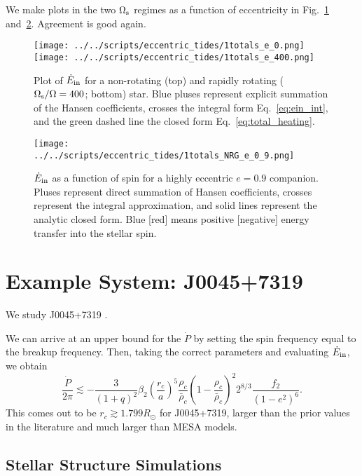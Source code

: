 \documentclass[
        fleqn,
        usenatbib,
    ]{mnras}
\begin{document}
We make plots in the two $\Omega_{\rm s}$ regimes as a function of eccentricity in
Fig.~\ref{fig:e0} and~\ref{fig:e_spin}. Agreement is good again.
\begin{figure}
    \centering
    \texttt{[image: ../../scripts/eccentric\_tides/1totals\_e\_0.png]}
    \texttt{[image: ../../scripts/eccentric\_tides/1totals\_e\_400.png]}
    \caption{Plot of $\dot{E}_{\rm in}$ for a non-rotating (top) and rapidly
    rotating ($\Omega_{\rm s} / \Omega = 400$; bottom) star. Blue pluses
    represent explicit summation of the Hansen coefficients, crosses the
    integral form Eq.~\eqref{eq:ein_int}, and the green dashed line the closed
    form Eq.~\eqref{eq:total_heating}.}\label{fig:e0}
\end{figure}
\begin{figure}
    \centering
    \texttt{[image: ../../scripts/eccentric\_tides/1totals\_NRG\_e\_0\_9.png]}
    \caption{$\dot{E}_{\rm in}$ as a function of spin for a highly eccentric $e
    = 0.9$ companion. Pluses represent direct summation of Hansen coefficients,
    crosses represent the integral approximation, and solid lines represent
    the analytic closed form. Blue [red] means positive [negative]
    energy transfer into the stellar spin.}\label{fig:e_spin}
\end{figure}

\section{Example System: J0045+7319}\label{s:j00457319}

We study J0045+7319 \citep{bell1995psr}.

We can arrive at an upper bound for the $\dot{P}$ by setting the spin frequency
equal to the breakup frequency. Then, taking the correct parameters and
evaluating $\dot{E}_{\rm in}$, we obtain
\begin{equation}
    \frac{\dot{P}}{2\pi} \lesssim
        -\frac{3}{(1 + q)^2}\beta_2 \left(\frac{r_c}{a}\right)^5
        \frac{\rho_c}{\bar{\rho}_c} \left(1 -
        \frac{\rho_c}{\bar{\rho}_c}\right)^2 2^{8/3}\frac{f_2}{(1 - e^2)^6}.
\end{equation}
This comes out to be $r_c \gtrsim 1.799R_{\odot}$ for J0045+7319, larger than
the prior values in the literature and much larger than MESA models.

\subsection{Stellar Structure Simulations}
\end{document}
